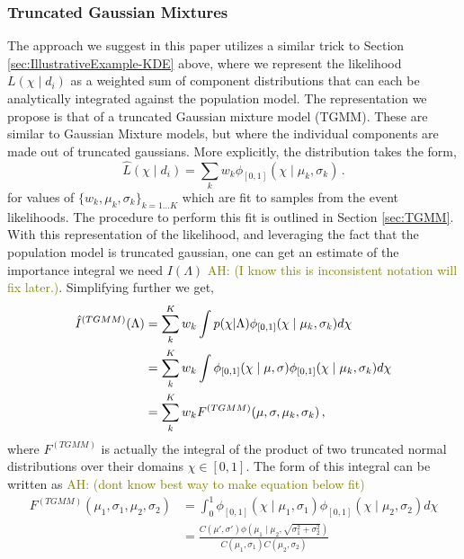 \documentclass[twocolumn,usenames,dvipsnames,linenumbers]{aastex631}
\newcommand{\asad}[1]{\textcolor{olive}{AH: #1}}
\begin{document}
\subsubsection{Truncated Gaussian Mixtures}
The approach we suggest in this paper utilizes a similar trick to Section \ref{sec:IllustrativeExample-KDE} above, where we represent the likelihood $L(\chi \mid d_i)$ as a weighted sum of component distributions that can each be analytically integrated against the population model. The representation we propose is that of a truncated Gaussian mixture model (TGMM). These are similar to Gaussian Mixture models, but where the individual components are made out of truncated gaussians. 
More explicitly, the distribution takes the form, 
\begin{equation}
	\hat{L}(\chi \mid d_i)  = \sum_k w_k \phi_{[0,1]}(\chi \mid \mu_k, \sigma_k) \,.
\end{equation}
for values of $\{w_k, \mu_k, \sigma_k\}_{k=1\dots K}$ which are fit to samples from the event likelihoods. The procedure to perform this fit is outlined in Section \ref{sec:TGMM}.
With this representation of the likelihood, and leveraging the fact that the population model is truncated gaussian, one can get an estimate of the importance integral we need $I(\Lambda)$ \asad{(I know this is inconsistent notation will fix later.)}. 
Simplifying further we get,
\begin{equation}
	\label{IllustrativeExampleTGMM-integral}
	\begin{split}
		\hat{I}^{({\tiny TGMM})}(\Lambda) &= \sum_k^K w_k \int p(\chi| \Lambda)  \phi_{[0,1]}(\chi \mid \mu_k, \sigma_k) d\chi \\
		&= \sum_k^K w_k \int\phi_{[0,1]}(\chi \mid \mu, \sigma)  \phi_{[0,1]}(\chi \mid \mu_k, \sigma_k) d\chi \\
		&= \sum_k^K  w_k F^{(TGMM)}(\mu, \sigma, \mu_k, \sigma_k)\,,
	\end{split}
\end{equation}
where $F^{(TGMM)}$ is actually the integral of the product of two truncated normal distributions over their domains $\chi \in [0,1]$. The form of this integral can be written as \asad{(dont know best way to make equation below fit)}
\begin{equation}
	\begin{split}
		F^{(TGMM)}(\mu_1, \sigma_1, \mu_2, \sigma_2) &= \int_0^1 \phi_{[0,1]}(\chi \mid \mu_1, \sigma_1) \phi_{[0,1]}(\chi \mid \mu_2, \sigma_2) d\chi  \\
		&= \frac{C(\mu', \sigma') \phi(\mu_1 \mid \mu_2, \sqrt{\sigma_1^2 + \sigma_2^2})}{C(\mu_1,\sigma_1) C(\mu_2,\sigma_2)}\,
	\end{split}
\end{equation}
\end{document}
